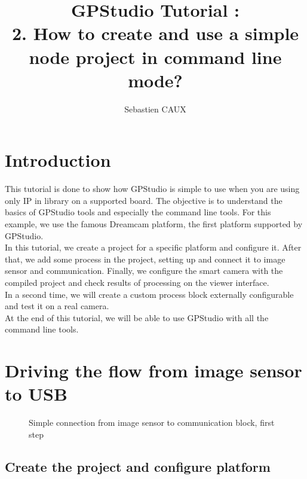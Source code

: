 \documentclass[10pt,a4paper]{article}
\author{Sebastien CAUX}
\title{GPStudio Tutorial \version : \\ 2. How to create and use a simple node project in command line mode?}
\begin{document}
\maketitle
\section{Introduction}
This tutorial is done to show how GPStudio is simple to use when you are using only IP in library on a supported board. The objective is to understand the basics of GPStudio tools and especially the command line tools. For this example, we use the famous Dreamcam platform, the first platform supported by GPStudio.\\

In this tutorial, we create a project for a specific platform and configure it. After that, we add some process in the project, setting up and connect it to image sensor and communication. Finally, we configure the smart camera with the compiled project and check results of processing on the viewer interface. \\

In a second time, we will create a custom process block externally configurable and test it on a real camera. \\

At the end of this tutorial, we will be able to use GPStudio with all the command line tools.

\section{Driving the flow from image sensor to USB}

\begin{figure}[h!]
\centering
{}
\caption{Simple connection from image sensor to communication block, first step}
\end{figure}

\subsection{Create the project and configure platform}
\end{document}
